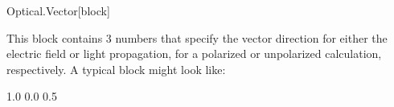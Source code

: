   \begin{fdfentry}{Optical.Vector}[block]
  
    This block contains 3 numbers that specify the vector direction for
    either the electric field or light propagation, for a polarized or
    unpolarized calculation, respectively. A typical block might look
    like:
    \begin{fdfexample}
          1.0 0.0 0.5
    \end{fdfexample}
  
  \end{fdfentry}
  
  
  